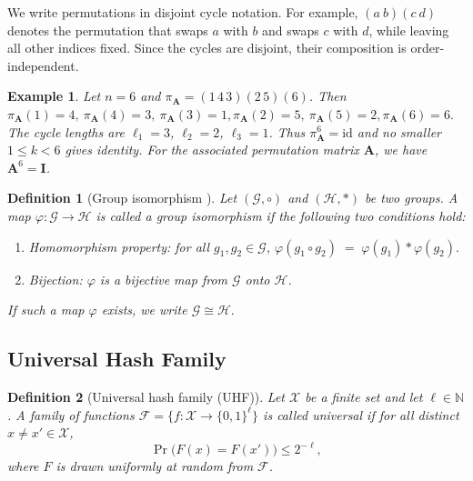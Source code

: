 \documentclass[onecolumn]{IEEEtran} %
\newcommand{\1}{\mathbbm{1}}
\theoremstyle{boldremark}
\newtheorem{definition}{Definition}
\newtheorem{example}{Example}
\begin{document}
We write permutations in disjoint cycle notation. For example,
$(a\ b)(c\ d)$ denotes the permutation that swaps $a$ with $b$ and swaps $c$ with $d$,
while leaving all other indices fixed. Since the cycles are disjoint, their composition is order-independent.


\begin{example}\label{EX_cycle}
    Let $n=6$ and $\pi_{\mathbf A}=(1\,4\,3)(2\,5)(6)$.
Then $\pi_{\mathbf A}(1)=4,\ \pi_{\mathbf A}(4)=3,\ \pi_{\mathbf A}(3)=1,
\pi_{\mathbf A}(2)=5,\ \pi_{\mathbf A}(5)=2,
\pi_{\mathbf A}(6)=6.$
The cycle lengths are $\ell_1=3$, $\ell_2=2$, $\ell_3=1$.
Thus $\pi_{\mathbf A}^6=\mathrm{id}$ and no smaller $1\le k<6$ gives identity.
For the associated permutation matrix $\mathbf A$, we have $\mathbf A^6=\mathbf I$.
\end{example} 

\begin{definition}[Group isomorphism \cite{DummitFoote2004}]\label{Def_group_isomorphism}
Let $(\mathcal{G},\circ)$ and $(\mathcal{H},\ast)$ be two groups.
A map $\varphi:\mathcal{G}\to\mathcal{H}$ is called a \emph{group isomorphism} if the following two conditions hold:
\begin{enumerate}
\item {Homomorphism property:} for all $g_1,g_2\in\mathcal{G}$, $\varphi(g_1\circ g_2) \;=\; \varphi(g_1)\ast\varphi(g_2).$
\item {Bijection:} $\varphi$ is a bijective map from $\mathcal{G}$ onto $\mathcal{H}$.
\end{enumerate}
If such a map $\varphi$ exists, we write $\mathcal{G} \cong \mathcal{H}.$
\end{definition}




\subsection{Universal Hash Family}
\begin{definition}[Universal hash family (UHF)]
Let $\mathcal{X}$ be a finite set and let $\ell\in\mathbb{N}$.
A family of functions $\mathcal{F}=\{f:\mathcal{X}\to\{0,1\}^{\ell}\}$ is called
\emph{universal} if for all distinct $x\neq x'\in\mathcal{X}$,
\[
\Pr\big(F(x)=F(x')\big)\le 2^{-\ell},
\]
where $F$ is drawn uniformly at random from $\mathcal{F}$.
\end{definition}
\end{document}
